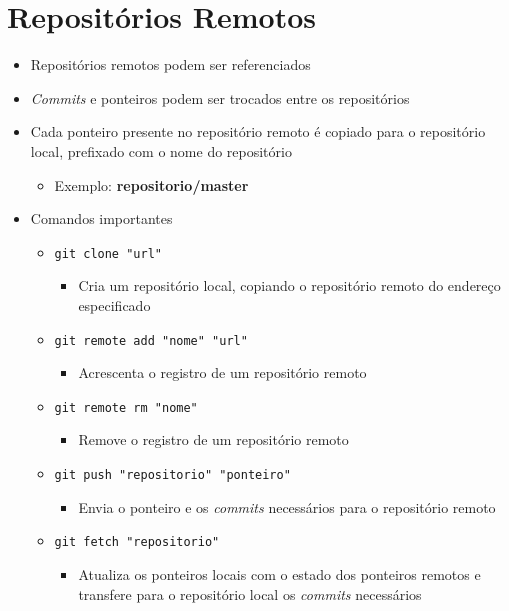 \documentclass{beamer}
\newenvironment{slide}{\begin{frame}{\insertsection}}{\end{frame}}
\begin{document}
\section{Repositórios Remotos}
\begin{slide}
    \begin{itemize}
        \item Repositórios remotos podem ser referenciados
        \pause
        \item \emph{Commits} e ponteiros podem ser trocados entre os
            repositórios
        \pause
        \item Cada ponteiro presente no repositório remoto é copiado para o
            repositório local, prefixado com o nome do repositório
            \begin{itemize}
                \pause
                \item Exemplo: \textbf{repositorio/master}
            \end{itemize}
        \pause
        \item Comandos importantes
        \begin{itemize}
            \pause
            \item \texttt{git clone "url"}
            \begin{itemize}
                \item Cria um repositório local, copiando o repositório remoto
                    do endereço especificado
            \end{itemize}
            \pause
            \item \texttt{git remote add "nome"}\texttt{ "url"}
            \begin{itemize}
                \item Acrescenta o registro de um repositório remoto
            \end{itemize}
            \pause
            \item \texttt{git remote rm "nome"}
            \begin{itemize}
                \item Remove o registro de um repositório remoto
            \end{itemize}
            \pause
            \item \texttt{git push "repositorio"}\texttt{ "ponteiro"}
            \begin{itemize}
                \item Envia o ponteiro e os \emph{commits} necessários para o
                    repositório remoto
            \end{itemize}
            \pause
            \item \texttt{git fetch "repositorio"}
            \begin{itemize}
                \item Atualiza os ponteiros locais com o estado dos ponteiros
                    remotos e transfere para o repositório local os
                    \emph{commits} necessários
            \end{itemize}
        \end{itemize}
    \end{itemize}
\end{slide}
\end{document}
